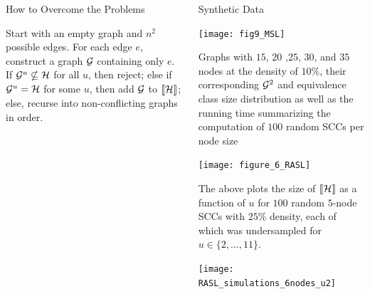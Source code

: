 \documentclass[final,hyperref={pdfpagelabels=false}]{beamer}
\renewcommand{\raggedright}{\leftskip=0.5cm \rightskip=0.5cm plus 0cm}
\begin{document}
\begin{frame}{}
\begin{columns}[t]
\begin{column}{.48\linewidth}
\begin{block}{\Large How to Overcome the Problems}
        \begin{minipage}{.9\textwidth}
        \vspace{20 mm}
          Start with an empty graph and $n^2$  possible edges. For each edge $e$, construct a graph ${\cal G}$ containing only $e$. If ${\cal G}^{u} \nsubseteq {\cal  H}$  for all $u$, then reject; else if ${\cal G}^{u} = {\cal  H}$ for some $u$, then add ${\cal G}$ to $\llbracket{\cal H}\rrbracket$; else, recurse into non-conflicting graphs in order.
        \end{minipage}%
        \end{block}
  
  

      \end{column}
      \begin{column}{.48\linewidth}


        \begin{block}{\Large Synthetic Data}
          \begin{minipage}{1\textwidth}
          \texttt{[image: fig9\_MSL]}
        \end{minipage} %

        \begin{minipage}{.95\textwidth}
        \vspace{5 mm}
           Graphs with $15$, $20$ ,$25$, $30$, and $35$ nodes at the density of $10\%$, their corresponding ${\cal G}^{2}$ and equivalence class size distribution as well as the running time summarizing the computation of $100$ random SCCs per node size
        \end{minipage}%

        \begin{minipage}{1\textwidth}
                \vspace{5 mm}
          \texttt{[image: figure\_6\_RASL]}
        \end{minipage} %

        \begin{minipage}{.95\textwidth}
        \vspace{5 mm}
           The above plots the size of $\llbracket{\cal H}\rrbracket$ as a function of $u$ for $100$ random $5$-node SCCs with $25\%$ density,  each  of  which   was undersampled  for $u \in \{ 2 , \ldots , 11 \}$. 
        \end{minipage}%
       
        \begin{minipage}{1\textwidth}
                \vspace{5 mm}
          \texttt{[image: RASL\_simulations\_6nodes\_u2]}
        \end{minipage} %


\end{block}
\end{column}
\end{columns}
\end{frame}
\end{document}
